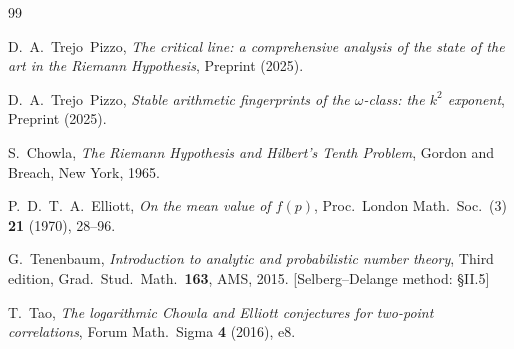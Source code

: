 \documentclass[11pt]{amsart}
\theoremstyle{definition}
\theoremstyle{remark}
\newcommand{\om}{\omega}
\begin{document}
\begin{thebibliography}{99}

D.~A.\ Trejo~Pizzo,
\emph{The critical line: a comprehensive analysis of the state of the art in the
Riemann Hypothesis},
Preprint (2025).

D.~A.\ Trejo~Pizzo,
\emph{Stable arithmetic fingerprints of the $\om$-class: the $k^2$ exponent},
Preprint (2025).

S.~Chowla,
\emph{The Riemann Hypothesis and Hilbert's Tenth Problem},
Gordon and Breach, New York, 1965.

P.~D.~T.~A.\ Elliott,
\emph{On the mean value of $f(p)$},
Proc.\ London Math.\ Soc.\ (3) \textbf{21} (1970), 28--96.

G.\ Tenenbaum,
\emph{Introduction to analytic and probabilistic number theory},
Third edition, Grad.\ Stud.\ Math.\ \textbf{163}, AMS, 2015.
[Selberg--Delange method: \S II.5]

T.~Tao,
\emph{The logarithmic Chowla and Elliott conjectures for two-point correlations},
Forum Math.\ Sigma \textbf{4} (2016), e8.

\end{thebibliography}
\end{document}
